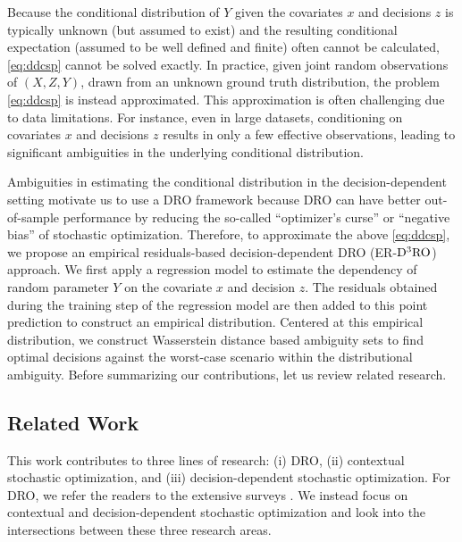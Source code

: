 \documentclass[onefignum,onetabnum]{siamart251216}
\begin{document}
Because the conditional distribution of $Y$ given the covariates $x$ and decisions $z$ is typically unknown (but assumed to exist) and the resulting conditional expectation (assumed to be well defined and finite) often cannot be calculated, \eqref{eq:ddcsp} cannot be solved exactly. In practice, given joint random observations of $(X, Z, Y)$, drawn from an unknown ground truth distribution, 
the problem \eqref{eq:ddcsp} is instead approximated. 
This approximation is often challenging due to data limitations. For instance, even in large datasets, conditioning on covariates $x$ and decisions $z$ results in only a few effective observations, leading to significant ambiguities in the underlying conditional distribution.


Ambiguities in estimating the conditional distribution in the decision-dependent setting motivate us to use a DRO framework because DRO can have better out-of-sample performance by reducing the so-called ``optimizer's curse'' or ``negative bias'' of stochastic optimization. 
Therefore, to approximate the above \eqref{eq:ddcsp}, we propose an empirical residuals-based decision-dependent DRO (ER-$\rm{D^3RO}$) approach. We first apply a regression model to estimate the dependency of random parameter $Y$ on the covariate $x$ and decision $z$. The residuals obtained during the training step of the regression model are then added to this point prediction to construct an empirical distribution. Centered at this empirical distribution, we construct 
Wasserstein distance based 
ambiguity sets to find optimal decisions against the worst-case scenario within the distributional ambiguity.
Before summarizing our contributions, let us review related research.

\subsection{Related Work}\label{sec: related work}
This work contributes to three lines of research: (i) DRO, (ii) contextual stochastic optimization, and (iii) decision-dependent stochastic optimization. For DRO, we refer the readers to the extensive surveys \cite{rahimian2019distributionally,kuhn2025distributionally}.  We instead focus on contextual and decision-dependent stochastic optimization and look into the intersections between these three research areas.  
\end{document}
